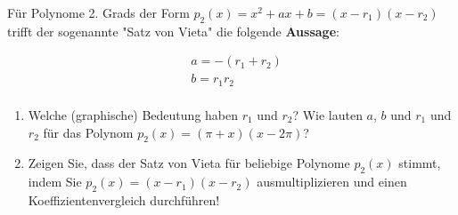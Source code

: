 \item Für Polynome 2. Grads der Form $p_2(x)=x^2+ax+b = (x-r_1)(x-r_2)$ trifft der sogenannte "Satz von Vieta" die folgende \textbf{Aussage}:

\begin{align*}
&a = -(r_1+r_2)\\
&b= r_1r_2\\
\end{align*}

\begin{enumerate}[label=(\alph*)]

\item Welche (graphische) Bedeutung haben $r_1$ und $r_2$? Wie lauten $a$, $b$ und $r_1$ und $r_2$ für das Polynom $p_2(x) = (\pi+x)(x-2\pi)$?

\item Zeigen Sie, dass der Satz von Vieta für beliebige Polynome $p_2(x)$ stimmt, indem Sie $p_2(x)=(x-r_1)(x-r_2)$ ausmultiplizieren
und einen Koeffizientenvergleich durchführen!

\end{enumerate}
